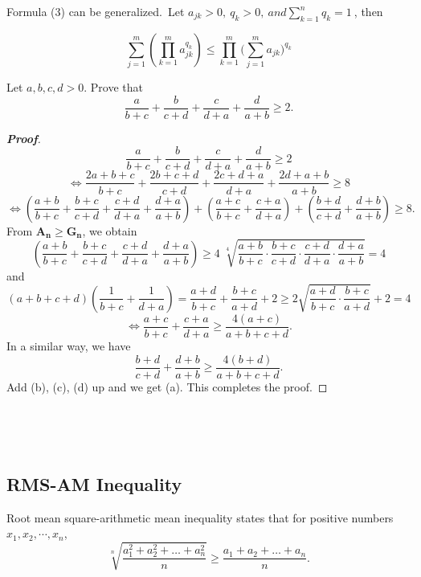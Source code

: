 \documentclass{memoir}
\begin{document}
Formula (3) can be generalized.\ Let $ a_{jk} > 0,\ q_k >0,\ and
\sum\limits_{k=1}^n q_k = 1\ $,
then

\begin{equation}
\sum_{j=1}^{m}\left(\prod_{k=1}^{m} a_{jk}^{q_k} \right)\leqslant
\prod_{k=1}^{m}\Bigg(\sum_{j=1}^{m} a_{jk} \Bigg)^{q_k}
\end{equation}

\par  \quad

\begin{example}
	Let $a,b,c,d >0$. Prove that
	\[\frac{a}{b+c} +\frac{b}{c+d} +\frac{c}{d+a} +\frac{d}{a+b} \geqslant 2.\]
\end{example}
\begin{proof}[\textbf{Proof}]
	\[\frac{a}{b+c} +\frac{b}{c+d} +\frac{c}{d+a} +\frac{d}{a+b} \geqslant 2\]
	\[\iff \frac{2a+b+c}{b+c} +\frac{2b+c+d}{c+d} +\frac{2c+d+a}{d+a} +\frac{2d+a+b}{a+b} \geqslant 8\]
	\begin{equation}
	\iff \left(\frac{a+b}{b+c} +\frac{b+c}{c+d}+\frac{c+d}{d+a}+\frac{d+a}{a+b}\right)+\left(\frac{a+c}{b+c} +\frac{c+a}{d+a}\right) +\left(\frac{b+d}{c+d}+\frac{d+b}{a+b}\right)  \geqslant 8.\tag{a}
	\end{equation}
	From $\boldsymbol{A_n}\geqslant \boldsymbol{G_n}$, we obtain
	\begin{equation}
	\left(\frac{a+b}{b+c} +\frac{b+c}{c+d}+\frac{c+d}{d+a}+\frac{d+a}{a+b}\right)\geqslant 4\;\sqrt[4]{\frac{a+b}{b+c}\cdot\frac{b+c}{c+d}\cdot\frac{c+d}{d+a}\cdot\frac{d+a}{a+b}}=4\tag{b}
	\end{equation}
	and
	\[\left(a+b+c+d\right)\left(\frac{1}{b+c}+\frac{1}{d+a}\right)=\frac{a+d}{b+c}+\frac{b+c}{a+d}+2\geqslant2\sqrt{\frac{a+d}{b+c}\cdot\frac{b+c}{a+d}}+2=4\]
	\begin{equation}
	\iff\frac{a+c}{b+c} +\frac{c+a}{d+a}\geqslant\frac{4\left(a+c\right)}{a+b+c+d}.\tag{c}
	\end{equation}
	In a similar way, we have
	\begin{equation}
	\frac{b+d}{c+d}+\frac{d+b}{a+b}\geqslant\frac{4\left(b+d\right)}{a+b+c+d}.\tag{d}
	\end{equation}
	Add (b), (c), (d) up and we get (a). This completes
	the proof.
\end{proof}

\par  \ \par \ 
\subsection{RMS-AM Inequality}
\begin{theorem}
	Root mean square-arithmetic mean inequality states that for positive numbers $x_1,x_2,\cdots,x_n$,
	\begin{equation}	\sqrt[n]{\frac{a_1^2+a_2^2+\dots+a_n^2}{n}}
	\geqslant\frac{a_1+a_2+\dots+a_n}{n}.
	\end{equation}
\end{theorem}
\par\;\par
\end{document}
